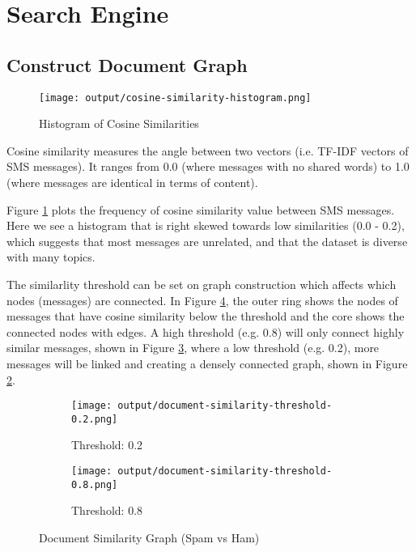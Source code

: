 \section{Search Engine}

\subsection{Construct Document Graph}

\begin{figure}[htbp]
    \centering
    \texttt{[image: output/cosine-similarity-histogram.png]}
    
    \caption{Histogram of Cosine Similarities}
    \label{fig:cosine-similarities}
\end{figure}

Cosine similarity measures the angle between two vectors (i.e. TF-IDF vectors of SMS messages). 
It ranges from 0.0 (where messages with no shared words) to 1.0 (where messages are identical in terms of content).

Figure \ref{fig:cosine-similarities} plots the frequency of cosine similarity value between SMS messages. 
Here we see a histogram that is right skewed towards low similarities (0.0 - 0.2), which suggests that most messages are unrelated, and that the dataset is diverse with many topics. 

The similarlity threshold can be set on graph construction which affects which nodes (messages) are connected.
In Figure \ref{fig:document-similarity-graph}, the outer ring shows the nodes of messages that have cosine similarity below the threshold and the core shows the connected nodes with edges.
A high threshold (e.g. 0.8) will only connect highly similar messages, shown in Figure \ref{fig:document-similarity-graph-0.8}, where a low threshold (e.g. 0.2), more messages will be linked and creating a densely connected graph, shown in Figure \ref{fig:document-similarity-graph-0.2}.


\begin{figure}[htbp]
    \centering
    \begin{subfigure}[b]{.8\textwidth}
        \centering
        \texttt{[image: output/document-similarity-threshold-0.2.png]} %
        \caption{Threshold: 0.2}
        \label{fig:document-similarity-graph-0.2}
    \end{subfigure}
    \hfill
    \begin{subfigure}[b]{.8\textwidth}
        \centering
        \texttt{[image: output/document-similarity-threshold-0.8.png]} %
        \caption{Threshold: 0.8}
        \label{fig:document-similarity-graph-0.8}
    \end{subfigure}
    
    \caption{Document Similarity Graph (Spam vs Ham)}
    \label{fig:document-similarity-graph}
\end{figure}



